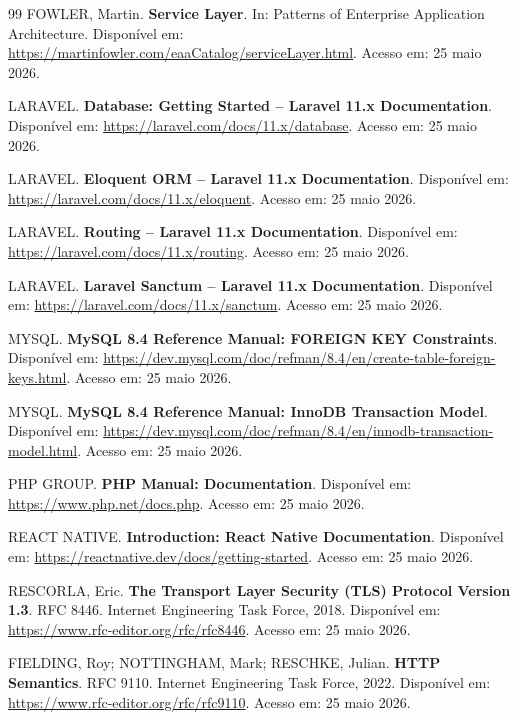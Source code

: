 \documentclass[12pt,a4paper]{article}
\begin{document}
\begin{thebibliography}{99}
FOWLER, Martin. \textbf{Service Layer}. In: Patterns of Enterprise Application
Architecture. Disponível em:
\url{https://martinfowler.com/eaaCatalog/serviceLayer.html}.
Acesso em: 25 maio 2026.

LARAVEL. \textbf{Database: Getting Started -- Laravel 11.x Documentation}.
Disponível em: \url{https://laravel.com/docs/11.x/database}.
Acesso em: 25 maio 2026.

LARAVEL. \textbf{Eloquent ORM -- Laravel 11.x Documentation}. Disponível em:
\url{https://laravel.com/docs/11.x/eloquent}.
Acesso em: 25 maio 2026.

LARAVEL. \textbf{Routing -- Laravel 11.x Documentation}. Disponível em:
\url{https://laravel.com/docs/11.x/routing}.
Acesso em: 25 maio 2026.

LARAVEL. \textbf{Laravel Sanctum -- Laravel 11.x Documentation}. Disponível em:
\url{https://laravel.com/docs/11.x/sanctum}.
Acesso em: 25 maio 2026.

MYSQL. \textbf{MySQL 8.4 Reference Manual: FOREIGN KEY Constraints}.
Disponível em:
\url{https://dev.mysql.com/doc/refman/8.4/en/create-table-foreign-keys.html}.
Acesso em: 25 maio 2026.

MYSQL. \textbf{MySQL 8.4 Reference Manual: InnoDB Transaction Model}.
Disponível em:
\url{https://dev.mysql.com/doc/refman/8.4/en/innodb-transaction-model.html}.
Acesso em: 25 maio 2026.

PHP GROUP. \textbf{PHP Manual: Documentation}. Disponível em:
\url{https://www.php.net/docs.php}.
Acesso em: 25 maio 2026.

REACT NATIVE. \textbf{Introduction: React Native Documentation}. Disponível
em: \url{https://reactnative.dev/docs/getting-started}.
Acesso em: 25 maio 2026.

RESCORLA, Eric. \textbf{The Transport Layer Security (TLS) Protocol Version
1.3}. RFC 8446. Internet Engineering Task Force, 2018. Disponível em:
\url{https://www.rfc-editor.org/rfc/rfc8446}.
Acesso em: 25 maio 2026.

FIELDING, Roy; NOTTINGHAM, Mark; RESCHKE, Julian.
\textbf{HTTP Semantics}. RFC 9110. Internet Engineering Task Force, 2022.
Disponível em: \url{https://www.rfc-editor.org/rfc/rfc9110}.
Acesso em: 25 maio 2026.

\end{thebibliography}
\end{document}
